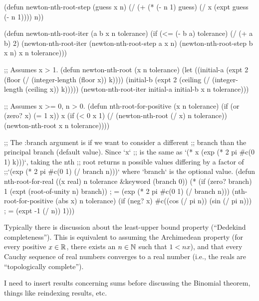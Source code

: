 \begin{lisp-example}
(defun newton-nth-root-step (guess x n)
  (/ (+ (* (- n 1) guess)
        (/ x (expt guess (- n 1))))
     n))

(defun newton-nth-root-iter (a b x n tolerance)
  (if (<= (- b a) tolerance)
    (/ (+ a b) 2)
    (newton-nth-root-iter (newton-nth-root-step a x n)
                          (newton-nth-root-step b x n)
                          x
                          n
                          tolerance)))

;; Assumes x > 1.
(defun newton-nth-root (x n tolerance)
  (let ((initial-a (expt 2 (floor (/ (integer-length (floor x)) k))))
        (initial-b (expt 2 (ceiling (/ (integer-length (ceiling x)) k)))))
    (newton-nth-root-iter initial-a initial-b x n tolerance)))

;; Assumes x >= 0, n > 0.
(defun nth-root-for-positive (x n tolerance)
  (if (or (zero? x) (= 1 x))
    x
    (if (< 0 x 1)
       (/ (newton-nth-root (/ x) n tolerance))
       (newton-nth-root x n tolerance))))

;; The :branch argument is if we want to consider a different
;; branch than the principal branch (default value). Since `x`
;; is the same as `(* x (exp (* 2 pi #c(0 1) k)))`, taking the nth
;; root returns n possible values differing by a factor of
;;`(exp (* 2 pi #c(0 1) (/ branch n)))` where `branch` is the optional value. 
(defun nth-root-for-real ((x real) n tolerance &keyword (branch 0))
  (* (if (zero? branch)
       1
       (expt (root-of-unity n) branch))  ; = (exp (* 2 pi #c(0 1) (/ branch n)))
     (nth-root-for-positive (abs x) n tolerance)
     (if (neg? x)
       #c((cos (/ pi n)) (sin (/ pi n))) ; = (expt -1 (/ n))
       1)))
\end{lisp-example}


Typically there is discussion about the least-upper bound property
(``Dedekind completeness''). This is equivalent to assuming the
Archimedean property (for every positive $x\in\mathbb{R}$, there exists an
$n\in\mathbb{N}$ such that $1 < nx$), and that every Cauchy sequence of real numbers
converges to a real number (i.e., the reals are ``topologically complete'').

I need to insert results concerning sums before discussing the Binomial
theorem, things like reindexing results, etc.